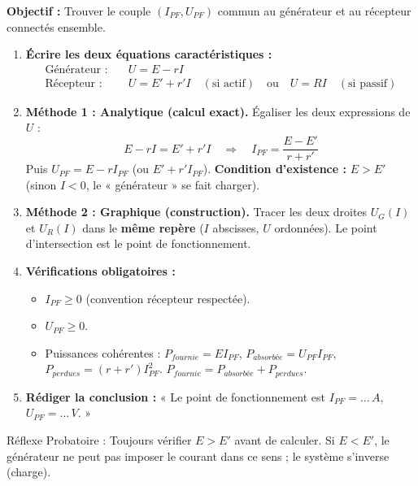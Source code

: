 \documentclass[11pt]{article}
\newcommand{\cle}[1]{{\popxbold\color{popdark}#1}}
\begin{document}
\begin{methode}
\textbf{Objectif :} Trouver le couple $(I_{PF}, U_{PF})$ commun au générateur et au récepteur connectés ensemble.
\begin{enumerate}
    \item \textbf{Écrire les deux équations caractéristiques :}
        \begin{align*}
            \text{Générateur :} \quad & U = E - r I \\
            \text{Récepteur :} \quad & U = E' + r' I \quad (\text{si actif}) \quad \text{ou} \quad U = R I \quad (\text{si passif})
        \end{align*}
    \item \textbf{Méthode 1 : Analytique (calcul exact).} Égaliser les deux expressions de $U$ :
    \[ E - r I = E' + r' I \quad \Rightarrow \quad I_{PF} = \frac{E - E'}{r + r'} \]
    Puis $U_{PF} = E - r I_{PF}$ (ou $E' + r' I_{PF}$).
    \textbf{Condition d'existence :} $E > E'$ (sinon $I<0$, le « générateur » se fait charger).
    \item \textbf{Méthode 2 : Graphique (construction).} Tracer les deux droites $U_G(I)$ et $U_R(I)$ dans le \textbf{même repère} ($I$ abscisses, $U$ ordonnées). Le point d'intersection est le point de fonctionnement.
    \item \textbf{Vérifications obligatoires :}
        \begin{itemize}
            \item $I_{PF} \ge 0$ (convention récepteur respectée).
            \item $U_{PF} \ge 0$.
            \item Puissances cohérentes : $P_{fournie} = E I_{PF}$, $P_{absorbée} = U_{PF} I_{PF}$, $P_{perdues} = (r+r') I_{PF}^2$. $P_{fournie} = P_{absorbée} + P_{perdues}$.
        \end{itemize}
    \item \textbf{Rédiger la conclusion :} « Le point de fonctionnement est $I_{PF} = \dots\,\si{A}$, $U_{PF} = \dots\,\si{V}$. »
\end{enumerate}
\cle{Réflexe Probatoire} : Toujours vérifier $E > E'$ avant de calculer. Si $E < E'$, le générateur ne peut pas imposer le courant dans ce sens ; le système s'inverse (charge).
\end{methode}
\end{document}
